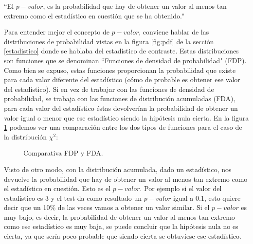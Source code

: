 \begin{center}
``El $p-valor$, es la probabilidad que hay de obtener un valor al menos tan extremo como el estadístico en cuestión
que se ha obtenido."
\end{center}

Para entender mejor el concepto de $p-valor$, conviene hablar de las distribuciones de probabilidad vistas en la
figura \ref{fig:pdf} de la sección \ref{estadistico} donde se hablaba del estadístico de contraste. Estas
distribuciones son funciones que se denominan ``Funciones de densidad de probabilidad" (FDP). Como bien se
expuso, estas funciones proporcionan la probabilidad que existe para cada valor diferente del estadístico (cómo
de probable es obtener ese valor del estadístico). Si en vez de trabajar con las funciones de densidad de 
probabilidad, se trabaja con las funciones de distribución acumuladas (FDA), para cada valor del estadístico
éstas devolverían la probabilidad de obtener un valor igual o menor que ese estadístico siendo la hipótesis nula
cierta. En la figura \ref{fig:comparativa_pdf_cdf} podemos ver una comparación entre los dos tipos de funciones
para el caso de la distribución $\chi^2$:

\begin{figure}[h]
\centering
{}
\caption{Comparativa FDP y FDA.}
\label{fig:comparativa_pdf_cdf}
\end{figure}

Visto de otro modo, con la distribución acumulada, dado un estadístico, nos devuelve la probabilidad que hay de
obtener un valor al menos tan extremo como el estadístico en cuestión. Esto es el $p-valor$. Por ejemplo si el valor
del estadístico es 3 y el test da como resultado un $p-valor$ igual a 0.1, esto quiere decir que un 10\% de las veces
vamos a obtener un valor similar. Si el $p-valor$ es muy bajo, es decir, la probabilidad de obtener un valor al menos
tan extremo como ese estadístico es muy baja, se puede concluir que la hipótesis nula no es cierta, ya que sería
poco probable que siendo cierta se obtuviese ese estadístico.

